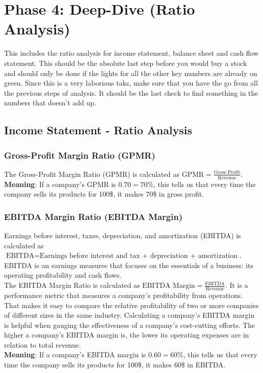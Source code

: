 \section{Phase 4: Deep-Dive (Ratio Analysis)}

This includes the ratio analysis for income statement, balance sheet and cash flow
statement. This should be the absolute last step before you would buy a stock and
should only be done if the lights for all the other key numbers are already on green.
Since this is a very laborious taks, make sure that you have the go from all the previous
steps of analysis. It should be the last check to find something in the numbers that
doesn’t add up.

\subsection{Income Statement - Ratio Analysis}

\subsubsection{Gross-Profit Margin Ratio (GPMR)}

The Gross-Profit Margin Ratio (GPMR) is calculated as
$\text{GPMR} = \frac{\text{Gross Profit}}{\text{Revenue}}$.\\
\textbf{Meaning}: If a company's GPMR is $0.70 = 70\%$, this tells us that every
time the company sells its products for 100\$, it makes 70\$ in gross profit.

\subsubsection{EBITDA Margin Ratio (EBITDA Margin)}

Earnings before interest, taxes, depreciation, and amortization (EBITDA) is calculated as
$\text{EBITDA} = \text{Earnings before interest and tax + depreciation + amortization}$.
EBITDA is an earnings measures that focuses on the essentials of a business: its
operating profitability and cash flows.\\
The EBITDA Margin Ratio is calculated as
$\text{EBITDA Margin} = \frac{\text{EBITDA}}{\text{Revenue}}$.
It is a performance metric that measures a company's profitability from
operations. That makes it easy to compare the relative profitability of two or
more companies of different sizes in the same industry. Calculating a company's
EBITDA margin is helpful when gauging the effectiveness of a company's cost-cutting
efforts. The higher a company's EBITDA margin is, the lower its operating expenses
are in relation to total revenue.\\
\textbf{Meaning}: If a company's EBITDA margin is $0.60 = 60\%$, this tells us
that every time the company sells its products for 100\$, it makes 60\$ in EBITDA.

